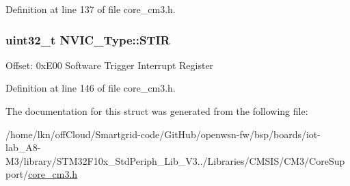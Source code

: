 Definition at line 137 of file core\+\_\+cm3.\+h.

\subsubsection[{\texorpdfstring{S\+T\+IR}{STIR}}]{ {\bf uint32\+\_\+t} N\+V\+I\+C\+\_\+\+Type\+::\+S\+T\+IR}\hypertarget{struct_n_v_i_c___type_a0b0d7f3131da89c659a2580249432749}{}\label{struct_n_v_i_c___type_a0b0d7f3131da89c659a2580249432749}
Offset\+: 0x\+E00 Software Trigger Interrupt Register 

Definition at line 146 of file core\+\_\+cm3.\+h.



The documentation for this struct was generated from the following file\+:\begin{DoxyCompactItemize}
\item 
/home/lkn/off\+Cloud/\+Smartgrid-\/code/\+Git\+Hub/openwsn-\/fw/bsp/boards/iot-\/lab\+\_\+\+A8-\/\+M3/library/\+S\+T\+M32\+F10x\+\_\+\+Std\+Periph\+\_\+\+Lib\+\_\+\+V3../\+Libraries/\+C\+M\+S\+I\+S/\+C\+M3/\+Core\+Support/\hyperlink{iot-lab___a8-_m3_2library_2_s_t_m32_f10x___std_periph___lib___v3_85_80_2_libraries_2_c_m_s_i_s_241d01c0ea18c1090ebeb06e5ef0ea5eb}{core\+\_\+cm3.\+h}\end{DoxyCompactItemize}
